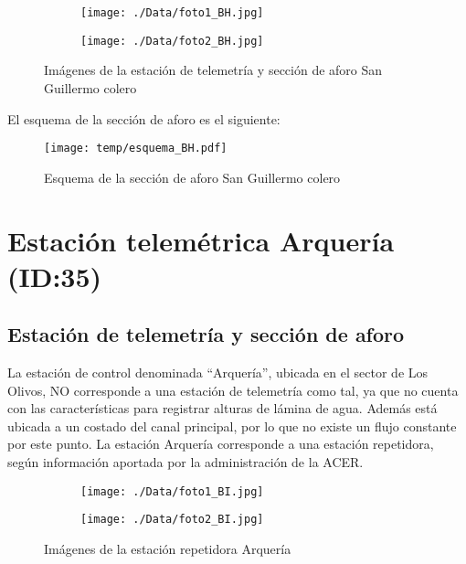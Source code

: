 \documentclass[]{article}
\begin{document}
\begin{figure}[H]
  \centering
\begin{subfigure}{.49\textwidth}
  \texttt{[image: ./Data/foto1\_BH.jpg]}
\end{subfigure}
\hfill
\begin{subfigure}{.49\textwidth}
  \texttt{[image: ./Data/foto2\_BH.jpg]}
\end{subfigure}
\caption{Imágenes de la estación de telemetría y sección de aforo San Guillermo colero}
\label{fig:fotos_34}
\end{figure}

El esquema de la sección de aforo es el siguiente:

\begin{figure}[!h]
  \centering
  \texttt{[image: temp/esquema\_BH.pdf]}
\caption{Esquema de la sección de aforo San Guillermo colero}
\label{fig:Esquema_BH}
\end{figure}


\clearpage
\section{Estación telemétrica Arquería (ID:35)}

\subsection{Estación de telemetría y sección de aforo}

La estación de control denominada ``Arquería'', ubicada en el sector de Los Olivos, NO corresponde a una estación de telemetría como tal, ya que no cuenta con las características para registrar alturas de lámina de agua. Además está ubicada a un costado del canal principal, por lo que no existe un flujo constante por este punto. La estación Arquería corresponde a una estación repetidora, según información aportada por la administración de la ACER.

\begin{figure}[H]
  \centering
\begin{subfigure}{.49\textwidth}
  \texttt{[image: ./Data/foto1\_BI.jpg]}
\end{subfigure}
\hfill
\begin{subfigure}{.49\textwidth}
  \texttt{[image: ./Data/foto2\_BI.jpg]}
\end{subfigure}
\caption{Imágenes de la estación repetidora Arquería}
\label{fig:fotos_35}
\end{figure}
\end{document}
